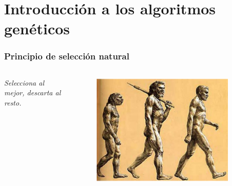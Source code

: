 \documentclass[10pt]{beamer}
\begin{document}
\section{Introducción a los algoritmos genéticos}
\begin{frame}
  \frametitle{Principio de selección natural}
  \begin{columns}
    \begin{column}{0.5\textwidth}
      \textit{Selecciona al mejor, descarta al resto.}
    \end{column}
    \begin{column}{0.5\textwidth}
      \begin{figure}[!h] 
        \centering
        \includegraphics[width=0.9\textwidth]{img/evo}
      \end{figure}  
    \end{column}
  \end{columns}
\end{frame}
\end{document}
